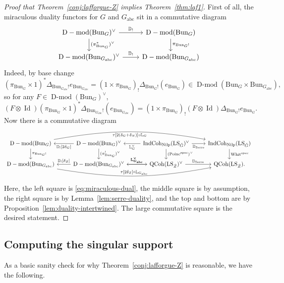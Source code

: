 \documentclass[11pt]{amsart}
\newcommand{\spec}{\mathrm{spec}}
\newcommand{\Bun}{{\mathrm{Bun}}}
\newcommand{\Whit}{\operatorname{Whit}}
\newcommand{\Poinc}{\operatorname{Poinc}}
\newcommand{\abc}{{\mathrm{abc}}}
\newcommand{\Nilp}{\mathrm{Nilp}}
\DeclareMathOperator{\QCoh}{QCoh}
\DeclareMathOperator{\Dmod}{D-mod}
\DeclareMathOperator{\IndCoh}{IndCoh}
\DeclareMathOperator{\LS}{LS}
\theoremstyle{remark}
\theoremstyle{definition}
\begin{document}
\begin{proof}[Proof that Theorem~\ref{conj:lafforgue-Z} implies Theorem~\ref{thm:laf1}]
First of all, the miraculous duality functors for $G$ and $G_\abc$ sit in a commutative diagram
\begin{equation}\label{eq:miraculous-dual}
\begin{tikzcd}
\Dmod(\Bun_G)^\vee\arrow{r}{\mathbb D_!}\arrow{d}{(\pi^*_{\Bun_G})^\vee}&\Dmod(\Bun_G)\arrow{d}{\pi_{\Bun_G!}}\\
\Dmod(\Bun_{G_\abc})^\vee\arrow{r}{\mathbb D_!}&\Dmod(\Bun_{G_\abc})
\end{tikzcd}
\end{equation}
Indeed, by base change
\[
(\pi_{\Bun_G}\times1)^*\Delta_{\Bun_{G_\abc}!}e_{\Bun_{G_\abc}}=(1\times\pi_{\Bun_G})_!\Delta_{\Bun_G!}(e_{\Bun_G})\in\Dmod(\Bun_G\times\Bun_{G_\abc}),
\]
so for any $F\in\Dmod(\Bun_G)^\vee$,
\begin{equation}
(F\otimes\operatorname{Id})(\pi_{\Bun_G}\times1)^*\Delta_{\Bun_{G_\abc}!}(e_{\Bun_{G_\abc}})=(1\times\pi_{\Bun_G})_!(F\otimes\operatorname{Id})\Delta_{\Bun_G!}e_{\Bun_G}.
\end{equation}
Now there is a commutative diagram
\[
\begin{tikzcd}
    \Dmod(\Bun_G)\arrow[swap,bend left=10]{rrr}{\tau[2(\delta_G+\delta_N)]\circ\mathbb L_G}\arrow{d}{\pi_{\Bun_G!}}&\arrow{l}{\mathbb D_![2\delta_G]}\Dmod(\Bun_G)^\vee\arrow{d}{(\pi_{\Bun_G}^!)^\vee}&\arrow{l}{\mathbb L_G^\vee}\IndCoh_\Nilp(\LS_{\check G})^\vee\arrow{d}{(\Poinc^\spec)^\vee}\arrow[swap]{r}{\mathbb D_{\mathrm{Serre}}}&\IndCoh_\Nilp(\LS_{\check G})\arrow{d}{\Whit^\spec}\\
    \Dmod(\Bun_{G_{\mathrm{abc}}})\arrow[bend right=10]{rrr}{\tau[2\delta_Z]\circ\mathbb L_{G_\abc}}&\arrow[swap]{l}{\mathbb D_![\delta_Z]}\Dmod(\Bun_{G_{\mathrm{abc}}})^\vee\arrow{r}{\mathbb L_{G_{\mathrm{abc}}}^\vee}&\arrow[swap]{l}{\mathbb L_{G_\abc}^\vee}\QCoh(\LS_{\check Z})^\vee\arrow{r}{\mathbb D_{\mathrm{Serre}}}&\QCoh(\LS_{\check Z}).
    \end{tikzcd}
\]
Here, the left square is \eqref{eq:miraculous-dual}, the middle square is by assumption, the right square is by Lemma~\ref{lem:serre-duality}, and the top and bottom are by Proposition~\ref{lem:duality-intertwined}. The large commutative square is the desired statement.
\end{proof}

\subsection{Computing the singular support}
As a basic sanity check for why Theorem~\ref{conj:lafforgue-Z} is reasonable, we have the following.
\end{document}
